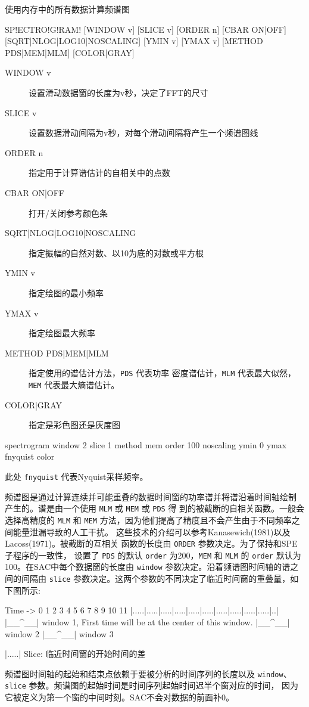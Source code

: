 \label{cmd:spectrogram}

使用内存中的所有数据计算频谱图

\begin{SACSTX}
SP!ECTRO!G!RAM! [WINDOW v] [SLICE v] [ORDER n] [CBAR ON|OFF]
    [SQRT|NLOG|LOG10|NOSCALING] [YMIN v] [YMAX v] [METHOD PDS|MEM|MLM]
    [COLOR|GRAY]
\end{SACSTX}

\begin{description}
\item [WINDOW v] 设置滑动数据窗的长度为v秒，决定了FFT的尺寸
\item [SLICE v] 设置数据滑动间隔为v秒，对每个滑动间隔将产生一个频谱图线
\item [ORDER n] 指定用于计算谱估计的自相关中的点数
\item [CBAR ON|OFF] 打开/关闭参考颜色条
\item [SQRT|NLOG|LOG10|NOSCALING] 指定振幅的自然对数、以10为底的对数或平方根
\item [YMIN v] 指定绘图的最小频率
\item [YMAX v] 指定绘图最大频率
\item [METHOD PDS|MEM|MLM] 指定使用的谱估计方法，\texttt{PDS} 代表功率
    密度谱估计，\texttt{MLM} 代表最大似然，\texttt{MEM} 代表最大熵谱估计。
\item [COLOR|GRAY] 指定是彩色图还是灰度图
\end{description}

\begin{SACDFT}
spectrogram window 2 slice 1 method mem order 100 noscaling
    ymin 0 ymax fnyquist color
\end{SACDFT}
此处 \texttt{fnyquist} 代表Nyquist采样频率。

频谱图是通过计算连续并可能重叠的数据时间窗的功率谱并将谱沿着时间轴绘制
产生的。谱是由一个使用 \texttt{MLM} 或 \texttt{MEM} 或 \texttt{PDS} 得
到的被截断的自相关函数。一般会选择高精度的 \texttt{MLM} 和 \texttt{MEM}
方法，因为他们提高了精度且不会产生由于不同频率之间能量泄漏导致的人工干扰。
这些技术的介绍可以参考Kanasewich(1981)以及Lacoss(1971)。被截断的互相关
函数的长度由 \texttt{ORDER} 参数决定。为了保持和SPE子程序的一致性，
设置了 \texttt{PDS} 的默认 \texttt{order} 为200，\texttt{MEM} 和
\texttt{MLM} 的 \texttt{order} 默认为100。在SAC中每个数据窗的长度由
\texttt{window} 参数决定。沿着频谱图时间轴的谱之间的间隔由 \texttt{slice}
参数决定。这两个参数的不同决定了临近时间窗的重叠量，如下图所示:
\begin{SACCode}
Time ->
0  1  2  3  4  5  6  7  8  9 10 11
|.....|.....|.....|.....|.....|.....|.....|.....|.....|.....|..|
|__^__| window 1, First time will be at the center of this window.
      |__^__| window 2
            |__^__| window 3

|.....| Slice: 临近时间窗的开始时间的差
\end{SACCode}
频谱图时间轴的起始和结束点依赖于要被分析的时间序列的长度以及 \texttt{window}、
\texttt{slice} 参数。频谱图的起始时间是时间序列起始时间迟半个窗对应的时间，
因为它被定义为第一个窗的中间时刻。SAC不会对数据的前面补0。

